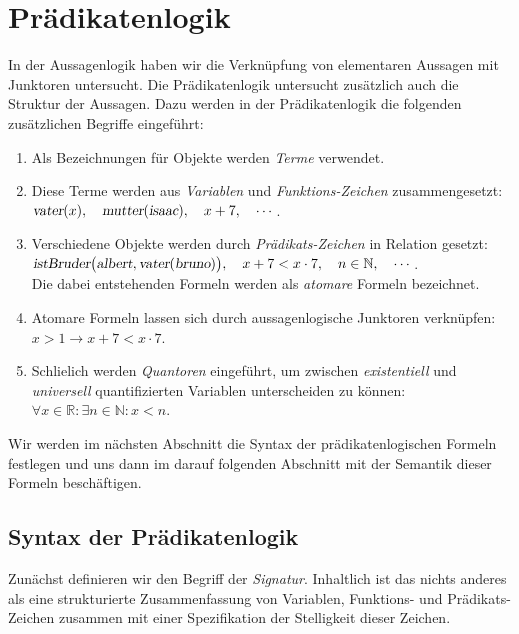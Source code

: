 \chapter{Pr\"{a}dikatenlogik}
In der Aussagenlogik haben wir die Verkn\"{u}pfung von elementaren Aussagen mit Junktoren untersucht.
Die Pr\"{a}dikatenlogik untersucht zus\"{a}tzlich auch die Struktur der Aussagen.  Dazu werden in der Pr\"{a}dikatenlogik 
die folgenden zus\"{a}tzlichen Begriffe eingef\"{u}hrt:
\begin{enumerate}
\item Als Bezeichnungen f\"{u}r Objekte werden \emph{Terme} verwendet.
\item Diese Terme werden aus \emph{Variablen} und \emph{Funktions-Zeichen}
      zusammengesetzt: 
      \\[0.2cm]
      \hspace*{1.3cm}
      $\textsl{vater}(x),\quad \textsl{mutter}(\textsl{isaac}), \quad x+7, \quad \cdots$.
\item Verschiedene Objekte werden durch \emph{Pr\"{a}dikats-Zeichen} in Relation gesetzt:
      \\[0.2cm]
      \hspace*{1.3cm}
      $\textsl{istBruder}\bigl(\textsl{albert}, \textsl{vater}(\textsl{bruno})\bigr),\quad x+7 < x\cdot 7,\quad n \in \mathbb{N}, \quad \cdots$.
      \\[0.2cm]
      Die dabei entstehenden Formeln werden als \emph{atomare} Formeln bezeichnet.
\item Atomare Formeln lassen sich durch aussagenlogische Junktoren verkn\"{u}pfen:
      \\[0.2cm]
      \hspace*{1.3cm}
      $x > 1 \rightarrow x + 7 < x \cdot  7$.
\item Schlie\3lich werden \emph{Quantoren} eingef\"{u}hrt, um zwischen \emph{existentiell} und
      \emph{universell} quantifizierten Variablen unterscheiden
      zu k\"{o}nnen:
      \\[0.2cm]
      \hspace*{1.3cm}
      $\forall x \in \mathbb{R}: \exists n \in \mathbb{N}: x < n$.
\end{enumerate}
Wir werden im n\"{a}chsten Abschnitt die Syntax der pr\"{a}dikatenlogischen Formeln festlegen und uns dann
im darauf folgenden Abschnitt mit der Semantik dieser Formeln besch\"{a}ftigen.

\section{Syntax der Pr\"{a}dikatenlogik}
Zun\"{a}chst definieren wir den Begriff der \emph{Signatur}.  Inhaltlich ist das nichts anderes als eine 
strukturierte Zusammenfassung von Variablen, Funktions- und Pr\"{a}dikats-Zeichen zusammen mit
einer Spezifikation der Stelligkeit dieser Zeichen.
 

